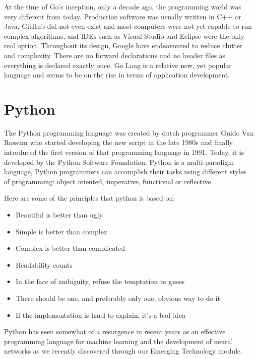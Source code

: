 At the time of Go's inception, only a decade ago, the programming world was very different from today. Production software was usually written in C++ or Java, GitHub did not even exist and most computers were not yet capable to run complex algorithms, and IDEs such as Visual Studio and Eclipse were the only real option. Throughout its design, Google have endeavoured to reduce clutter and complexity. There are no forward declarations and no header files as everything is declared exactly once. Go Lang is a relative new, yet popular language and seems to be on the rise in terms of application development.\newline


\section {Python}
The Python programming language was created by dutch programmer Guido Van Rossum who started developing the new script in the late 1980s and finally introduced the first version of that programming language in 1991. Today, it is developed by the Python Software Foundation. Python is a multi-paradigm language, Python programmers can accomplish their tasks using different styles of programming: object oriented, imperative, functional or reflective. \newline

Here are some of the principles that python is based on:\newline
\begin{itemize}
\item Beautiful is better than ugly
\item Simple is better than complex
\item Complex is better than complicated
\item Readability counts
\item In the face of ambiguity, refuse the temptation to guess
\item There should be one, and preferably only one, obvious way to do it
\item If the implementation is hard to explain, it’s a bad idea
\end{itemize}
\newline

Python has seen somewhat of a resurgence in recent years as an effective programming language for machine learning and the development of neural networks as we recently discovered through our Emerging Technology module.
\newline

